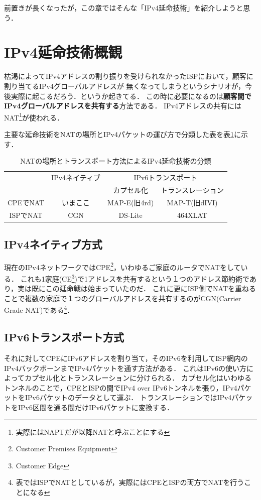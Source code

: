 前置きが長くなったが，この章ではそんな「IPv4延命技術」を紹介しようと思う．

\section{IPv4延命技術概観}

枯渇によってIPv4アドレスの割り振りを受けられなかったISPにおいて，顧客に割り当てるIPv4グローバルアドレスが
無くなってしまうというシナリオが，今後実際に起こるだろう．というか起きてる．
この時に必要になるのは\textbf{顧客間でIPv4グローバルアドレスを共有する}方法である．
IPv4アドレスの共有にはNAT\footnote{実際にはNAPTだが以降NATと呼ぶことにする}が使われる．

主要な延命技術をNATの場所とIPv4パケットの運び方で分類した表を表\ref{yuyarin-nat-transport}に示す．

\begin{table}[htbp]
\begin{center}
\begin{tabular}{c|ccc} \hline
 & IPv4ネイティブ & \multicolumn{2}{c}{IPv6トランスポート} \\
 & & カプセル化 & トランスレーション \\\hline
CPEでNAT & いまここ & MAP-E(旧4rd) & MAP-T(旧dIVI) \\
ISPでNAT & CGN & DS-Lite & 464XLAT \\\hline
\end{tabular}
\end{center}
\caption{NATの場所とトランスポート方法によるIPv4延命技術の分類}
\label{yuyarin-nat-transport}
\end{table}

\subsection{IPv4ネイティブ方式}

現在のIPv4ネットワークではCPE\footnote{Customer Premises Equipment}，いわゆるご家庭のルータでNATをしている．
これも1家庭(CE\footnote{Customer Edge})で1アドレスを共有するという１つのアドレス節約術であり，実は既にこの延命戦は始まっていたのだ．
これに更にISP側でNATを重ねることで複数の家庭で１つのグローバルアドレスを共有するのがCGN(Carrier Grade NAT)である\footnote{表ではISPでNATとしているが，実際にはCPEとISPの両方でNATを行うことになる}．

\subsection{IPv6トランスポート方式}
それに対してCPEにIPv6アドレスを割り当て，そのIPv6を利用してISP網内のIPv4バックボーンまでIPv4パケットを通す方法がある．
これはIPv6の使い方によってカプセル化とトランスレーションに分けられる．
カプセル化はいわゆるトンネルのことで，CPEとISPの間でIPv4 over IPv6トンネルを張り，IPv4パケットをIPv6パケットのデータとして運ぶ．
トランスレーションではIPv4パケットをIPv6区間を通る間だけIPv6パケットに変換する．

